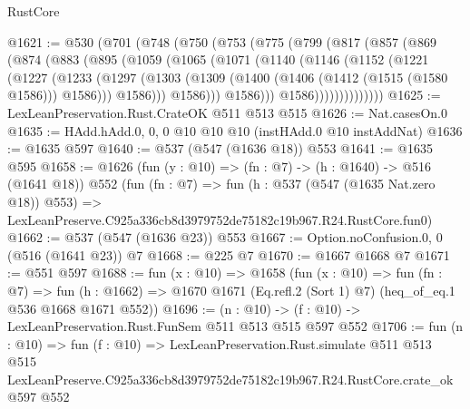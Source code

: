 \begin{lexlean}{RustCore}
\begin{coremodule}
@1621 := @530
    (@701
      (@748
        (@750
          (@753
            (@775
              (@799
                (@817
                  (@857
                    (@869
                      (@874
                        (@883
                          (@895
                            (@1059
                              (@1065
                                (@1071
                                  (@1140
                                    (@1146
                                      (@1152
                                        (@1221
                                          (@1227
                                            (@1233
                                              (@1297
                                                (@1303
                                                  (@1309
                                                    (@1400
                                                      (@1406 (@1412 (@1515 (@1580 @1586))) @1586)))
                                                  @1586)))
                                            @1586)))
                                      @1586)))
                                @1586))))))))))))))
@1625 := LexLeanPreservation.Rust.CrateOK @511 @513 @515
@1626 := Nat.casesOn.{0}
@1635 := HAdd.hAdd.{0, 0, 0} @10 @10 @10 (instHAdd.{0} @10 instAddNat)
@1636 := @1635 @597
@1640 := @537 (@547 (@1636 @18)) @553
@1641 := @1635 @595
@1658 := @1626
    (fun (y : @10) => (fn : @7) -> (h : @1640) -> @516 (@1641 @18))
    @552
    (fun (fn : @7) =>
    fun (h : @537 (@547 (@1635 Nat.zero @18)) @553) =>
    LexLeanPreserve.C925a336cb8d3979752de75182c19b967.R24.RustCore.fun0)
@1662 := @537 (@547 (@1636 @23)) @553
@1667 := Option.noConfusion.{0, 0} (@516 (@1641 @23)) @7
@1668 := @225 @7
@1670 := @1667 @1668 @7
@1671 := @551 @597
@1688 := fun (x : @10) =>
  @1658
    (fun (x : @10) =>
    fun (fn : @7) =>
    fun (h : @1662) => @1670 @1671 (Eq.refl.{2} (Sort 1) @7) (heq_of_eq.{1} @536 @1668 @1671 @552))
@1696 := (n : @10) -> (f : @10) -> LexLeanPreservation.Rust.FunSem @511 @513 @515 @597 @552
@1706 := fun (n : @10) =>
  fun (f : @10) =>
  LexLeanPreservation.Rust.simulate
    @511
    @513
    @515
    LexLeanPreserve.C925a336cb8d3979752de75182c19b967.R24.RustCore.crate_ok
    @597
    @552
\end{coremodule}
\end{lexlean}

